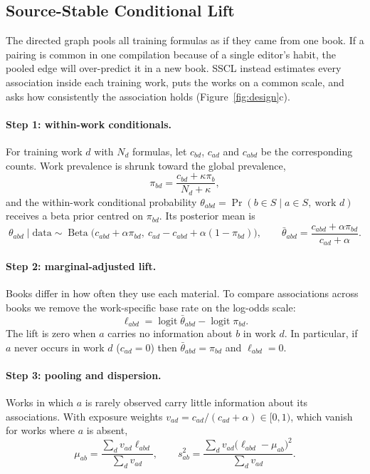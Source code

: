 \documentclass[applsci,article,submit,oneauthor]{Definitions/mdpi}
\newcommand{\logit}{\operatorname{logit}}
\begin{document}
\subsection{Source-Stable Conditional Lift}
\label{sec:sscl}

The directed graph pools all training formulas as if they came from one book. If a pairing is common in one compilation because of a single editor's habit, the pooled edge will over-predict it in a new book. SSCL instead estimates every association inside each training work, puts the works on a common scale, and asks how consistently the association holds (Figure~\ref{fig:design}c).

\paragraph{Step 1: within-work conditionals.} For training work $d$ with $N_d$ formulas, let $c_{bd}$, $c_{ad}$ and $c_{abd}$ be the corresponding counts. Work prevalence is shrunk toward the global prevalence,
\begin{equation}
\pi_{bd}=\frac{c_{bd}+\kappa\pi_b}{N_d+\kappa},
\label{eq:workprev}
\end{equation}
and the within-work conditional probability $\theta_{abd}=\Pr(b\in S\mid a\in S,\ \text{work }d)$ receives a beta prior centred on $\pi_{bd}$. Its posterior mean is
\begin{equation}
\theta_{abd}\mid\text{data}\sim\operatorname{Beta}\bigl(c_{abd}+\alpha\pi_{bd},\ c_{ad}-c_{abd}+\alpha(1-\pi_{bd})\bigr),\qquad
\bar\theta_{abd}=\frac{c_{abd}+\alpha\pi_{bd}}{c_{ad}+\alpha}.
\label{eq:beta}
\end{equation}

\paragraph{Step 2: marginal-adjusted lift.} Books differ in how often they use each material. To compare associations across books we remove the work-specific base rate on the log-odds scale:
\begin{equation}
\ell_{abd}=\logit\bar\theta_{abd}-\logit\pi_{bd}.
\label{eq:lift}
\end{equation}
The lift is zero when $a$ carries no information about $b$ in work $d$. In particular, if $a$ never occurs in work $d$ ($c_{ad}=0$) then $\bar\theta_{abd}=\pi_{bd}$ and $\ell_{abd}=0$.

\paragraph{Step 3: pooling and dispersion.} Works in which $a$ is rarely observed carry little information about its associations. With exposure weights $v_{ad}=c_{ad}/(c_{ad}+\alpha)\in[0,1)$, which vanish for works where $a$ is absent,
\begin{equation}
\mu_{ab}=\frac{\sum_dv_{ad}\ell_{abd}}{\sum_dv_{ad}},\qquad
s_{ab}^2=\frac{\sum_dv_{ad}\bigl(\ell_{abd}-\mu_{ab}\bigr)^2}{\sum_dv_{ad}}.
\label{eq:pool}
\end{equation}
\end{document}
